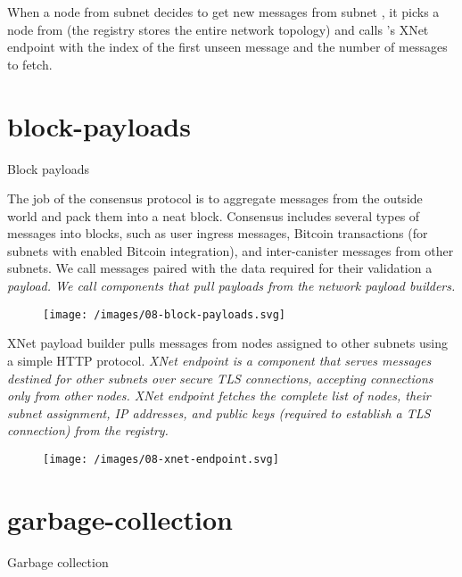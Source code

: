 \documentclass{article}
\begin{document}
When a node from subnet  decides to get new messages from subnet , it picks a node from  (the registry stores the entire network topology) and calls 's XNet endpoint with the index of the first unseen message and the number of messages to fetch.

\section{block-payloads}{Block payloads}

The job of the consensus protocol is to aggregate messages from the outside world and pack them into a neat block.
Consensus includes several types of messages into blocks, such as user ingress messages, Bitcoin transactions (for subnets with enabled Bitcoin integration), and inter-canister messages from other subnets.
We call messages paired with the data required for their validation a \em{payload}.
We call components that pull payloads from the network \em{payload builders}.

\begin{figure}[grayscale-diagram]
  \texttt{[image: /images/08-block-payloads.svg]}
\end{figure}

XNet payload builder pulls messages from nodes assigned to other subnets using a simple HTTP protocol.
\em{XNet endpoint} is a component that serves messages destined for other subnets over secure TLS connections, accepting connections only from other nodes.
XNet endpoint fetches the complete list of nodes, their subnet assignment, IP addresses, and public keys (required to establish a TLS connection) from the registry.

\begin{figure}[grayscale-diagram]
  \texttt{[image: /images/08-xnet-endpoint.svg]}
\end{figure}

\section{garbage-collection}{Garbage collection}
\end{document}
